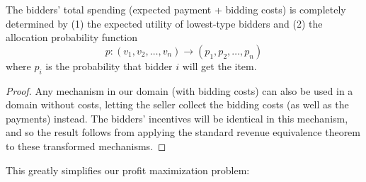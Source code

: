 \begin{theorem}\label{theorem:equivalence}
The bidders' total spending (expected payment + bidding costs)
is completely determined by (1) the expected utility of
lowest-type bidders and (2) the allocation probability function
$$p: (v_1, v_2, \ldots, v_n) \rightarrow (p_1, p_2, \ldots, p_n)$$ 
where $p_i$ is the probability that bidder $i$ will get the item.
\end{theorem}
\begin{proof}
  Any mechanism in our domain (with bidding costs) can also be used in a
  domain without costs, letting the seller collect the bidding costs (as
  well as the payments) instead.  The bidders' incentives will be identical
  in this mechanism, and so the result follows from applying the
  standard revenue equivalence theorem to these transformed mechanisms.
\end{proof}


This greatly simplifies our profit maximization problem:

